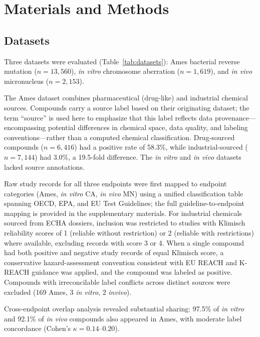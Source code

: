 \documentclass[journal=jacsat,manuscript=article]{achemso}
\begin{document}
\section{Materials and Methods}

\subsection{Datasets}

Three datasets were evaluated (Table~\ref{tab:datasets}): Ames bacterial reverse mutation 
($n = 13{,}560$), \textit{in vitro} chromosome aberration ($n = 1{,}619$), and \textit{in vivo} micronucleus 
($n = 2{,}153$).

The Ames dataset combines pharmaceutical (drug-like) and industrial chemical sources. 
Compounds carry a source label based on their originating dataset; the term ``source'' is 
used here to emphasize that this label reflects data provenance---encompassing potential 
differences in chemical space, data quality, and labeling conventions---rather than a 
computed chemical classification. Drug-sourced compounds ($n = 6{,}416$) had a positive 
rate of 58.3\%, while industrial-sourced ($n = 7{,}144$) had 3.0\%, a 19.5-fold difference. 
The \textit{in vitro} and \textit{in vivo} datasets lacked source annotations.

Raw study records for all three endpoints were first mapped to endpoint categories (Ames, 
\textit{in vitro} CA, \textit{in vivo} MN) using a unified classification table spanning OECD, EPA, and EU 
Test Guidelines; the full guideline-to-endpoint mapping is provided in the supplementary 
materials. For industrial chemicals sourced from ECHA dossiers, inclusion was restricted to 
studies with Klimisch reliability scores of 1 (reliable without restriction) or 2 (reliable 
with restrictions) where available,\cite{Klimisch_1997} excluding records with score 3 or 4. 
When a single compound had both positive and negative study records of equal Klimisch score, 
a conservative hazard-assessment convention consistent with EU REACH and K-REACH 
guidance\cite{EU_REACH_2006,K_REACH_2018} was applied, and the compound was labeled as 
positive. Compounds with irreconcilable label conflicts across distinct sources were excluded 
(169 Ames, 3 \textit{in vitro}, 2 \textit{invivo}).

Cross-endpoint overlap analysis revealed substantial sharing: 97.5\% of \textit{in vitro} and 92.1\% 
of \textit{in vivo} compounds also appeared in Ames, with moderate label concordance 
(Cohen's $\kappa = 0.14$--$0.20$).
\end{document}
